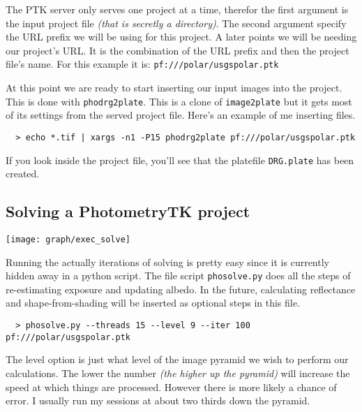 The PTK server only serves one project at a time, therefor the first
argument is the input project file \emph{(that is secretly a
  directory)}. The second argument specify the URL prefix we will be
using for this project. A later points we will be needing our
project's URL. It is the combination of the URL prefix and then the
project file's name. For this example it is: \texttt{pf:///polar/usgspolar.ptk}

At this point we are ready to start inserting our input images into
the project. This is done with \texttt{phodrg2plate}. This is a clone
of \texttt{image2plate} but it gets most of its settings from the
served project file. Here's an example of me inserting files.

\begin{verbatim}
  > echo *.tif | xargs -n1 -P15 phodrg2plate pf:///polar/usgspolar.ptk
\end{verbatim}

If you look inside the project file, you'll see that the platefile
\texttt{DRG.plate} has been created.

\subsection{Solving a PhotometryTK project}

  \begin{center}
    \texttt{[image: graph/exec\_solve]}
  \end{center}

Running the actually iterations of solving is pretty easy since it is
currently hidden away in a python script. The file script
\texttt{phosolve.py} does all the steps of re-estimating exposure and
updating albedo. In the future, calculating reflectance and
shape-from-shading will be inserted as optional steps in this file.

\begin{verbatim}
  > phosolve.py --threads 15 --level 9 --iter 100 pf:///polar/usgspolar.ptk
\end{verbatim}

The level option is just what level of the image pyramid we wish to
perform our calculations. The lower the number \emph{(the higher up
  the pyramid)} will increase the speed at which things are
processed. However there is more likely a chance of error. I usually
run my sessions at about two thirds down the pyramid.

